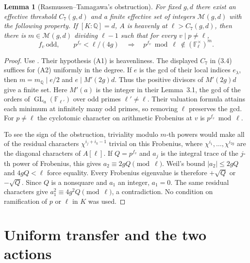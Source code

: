 \documentclass[11pt]{article}
\newtheorem{lemma}[theorem]{Lemma}
\newcommand{\Q}{\mathbb Q}
\newcommand{\F}{\mathbb F}
\newcommand{\GL}{\operatorname{GL}}
\begin{document}
\begin{lemma}[Rasmussen--Tamagawa's obstruction]\label{RT}
For fixed $g,d$ there exist an effective threshold $C_7(g,d)$
and a finite effective set of integers $\mathcal M(g,d)$ with the
following property. If $[K:\Q]=d$, $A$ is heavenly at
$\ell>C_7(g,d)$, then there is $m\in\mathcal M(g,d)$ dividing
$\ell-1$ such that for every $v\mid p\ne\ell$,
\[
  f_v\ \text{odd},\qquad p^{f_v}<\ell/(4g)
   \quad\Longrightarrow\quad
   p^{f_v}\bmod\ell\ \notin(\F_\ell^\times)^m .
\]
\end{lemma}
\begin{proof}
Use \cite[Cor.~3.2, (3.4), Lem.~3.5, \S4.1, Prop.~4.2]{rt}.
Their hypothesis (A1) is heavenliness. The displayed $C_7$ in
(3.4) suffices for (A2) uniformly in the degree. If $e$ is the
gcd of their local indices $e_\lambda$, then
$m=m_{\Q}\mid e/2$ and $e\mid M'(2g)d$. Thus the positive divisors
of $M'(2g)d$ give a finite set. Here $M'(a)$ is the integer in their
Lemma~3.1, the gcd of the orders of $\GL_a(\F_{\ell'})$ over odd
primes $\ell'\ne\ell$. Their valuation formula attains each minimum at infinitely many odd primes, so removing $\ell$ preserves the gcd. For $p\ne\ell$ the cyclotomic character
on arithmetic Frobenius at $v$ is $p^{f_v}\bmod\ell$.

To see the sign of the obstruction, triviality modulo $m$-th powers
would make all of the residual characters
$\chi^{i_j+i_k-1}$ trivial on this Frobenius, where
$\chi^{i_1},\dots,\chi^{i_{2g}}$ are the diagonal characters of
$A[\ell]$. If $Q=p^{f_v}$ and $a_j$ is the integral trace of the
$j$-th power of Frobenius, this gives $a_2\equiv 2gQ\pmod\ell$.
Weil's bound $|a_2|\le2gQ$ and $4gQ<\ell$ force equality.
Every Frobenius eigenvalue is therefore $+\sqrt Q$ or $-\sqrt Q$.
Since $Q$ is a nonsquare and $a_1$ an integer, $a_1=0$.
The same residual characters give $a_1^2\equiv4g^2Q\pmod\ell$,
a contradiction. No condition on ramification of $p$ or $\ell$ in
$K$ was used.
\end{proof}

\section{Uniform transfer and the two actions}
\end{document}
